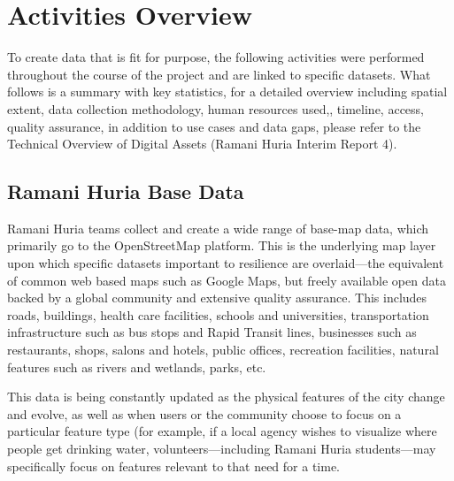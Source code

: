\documentclass[a4paper,12pt,twoside]{article}
\begin{document}
\newpage
\section{Activities Overview}
\begin{multicols}{2}
To create data that is fit for purpose, the following activities were performed throughout the course of the project and are linked to specific datasets. What follows is a summary with key statistics, for a detailed overview including spatial extent, data collection methodology, human resources used,, timeline, access, quality assurance, in addition to use cases and data gaps, please refer to the Technical Overview of Digital Assets (Ramani Huria Interim Report 4). 
\end{multicols}

\subsection{Ramani Huria Base Data}
\begin{multicols}{2}
Ramani Huria teams collect and create a wide range of base-map data, which primarily go to the OpenStreetMap platform. This is the underlying map layer upon which specific datasets important to resilience are overlaid—the equivalent of common web based maps such as Google Maps, but freely available open data backed by a global community and extensive quality assurance. This includes roads, buildings, health care facilities, schools and universities, transportation infrastructure such as bus stops and Rapid Transit lines, businesses such as restaurants, shops, salons and hotels, public offices, recreation facilities, natural features such as rivers and wetlands, parks, etc. 

This data is being constantly updated as the physical features of the city change and evolve, as well as when users or the community choose to focus on a particular feature type (for example, if a local agency wishes to visualize where people get drinking water, volunteers—including Ramani Huria students—may specifically focus on features relevant to that need for a time.
\end{multicols}
\end{document}
